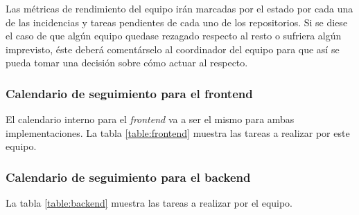 \documentclass[11pt, a4paper, titlepage]{article}
\begin{document}
Las métricas de rendimiento del equipo irán marcadas por el estado por cada una de las incidencias y tareas pendientes de cada uno de los repositorios. Si se diese el caso de que algún equipo quedase rezagado respecto al resto o sufriera algún imprevisto, éste deberá comentárselo al coordinador del equipo para que así se pueda tomar una decisión sobre cómo actuar al respecto.

\subsubsection{Calendario de seguimiento para el frontend}
El calendario interno para el \textit{frontend} va a ser el mismo para ambas implementaciones. La tabla \ref{table:frontend} muestra las tareas a realizar por este equipo. \newline

\subsubsection{Calendario de seguimiento para el backend}
 La tabla \ref{table:backend} muestra las tareas a realizar por el equipo. \newline
\end{document}
